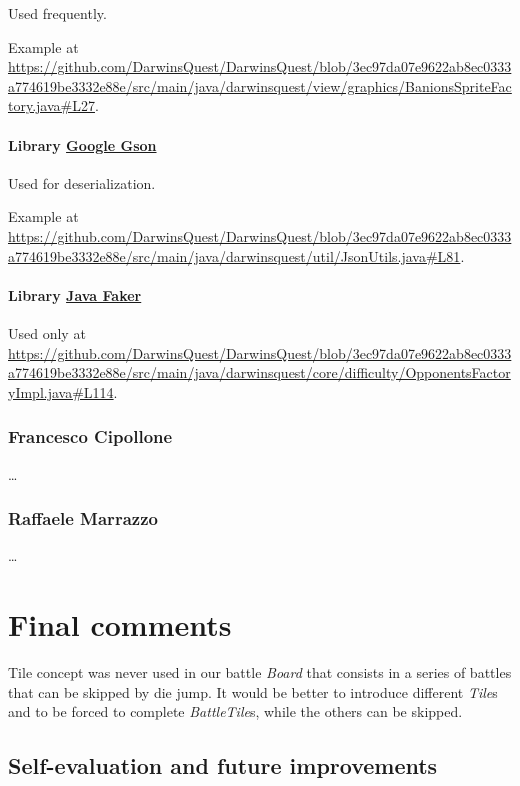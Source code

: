 \documentclass[12pt, a4paper]{report}
\begin{document}
        Used frequently.

        Example at \url{https://github.com/DarwinsQuest/DarwinsQuest/blob/3ec97da07e9622ab8ec0333a774619be3332e88e/src/main/java/darwinsquest/view/graphics/BanionsSpriteFactory.java#L27}.
        
        \subsubsection{Library \href{https://github.com/google/gson}{Google Gson}}
        
        Used for deserialization.

        Example at \url{https://github.com/DarwinsQuest/DarwinsQuest/blob/3ec97da07e9622ab8ec0333a774619be3332e88e/src/main/java/darwinsquest/util/JsonUtils.java#L81}.
        
        \subsubsection{Library \href{https://github.com/DiUS/java-faker}{Java Faker}}
        
        Used only at \url{https://github.com/DarwinsQuest/DarwinsQuest/blob/3ec97da07e9622ab8ec0333a774619be3332e88e/src/main/java/darwinsquest/core/difficulty/OpponentsFactoryImpl.java#L114}.

    \subsection*{Francesco Cipollone}

    \dots

    \subsection*{Raffaele Marrazzo}

    \dots

\chapter{Final comments}

    Tile concept was never used in our battle \emph{Board} that consists in a series of battles that can be skipped by die jump.
    It would be better to introduce different \emph{Tile}s and to be forced to complete \emph{BattleTile}s, while the others can be skipped.

\section{Self-evaluation and future improvements}
\end{document}
